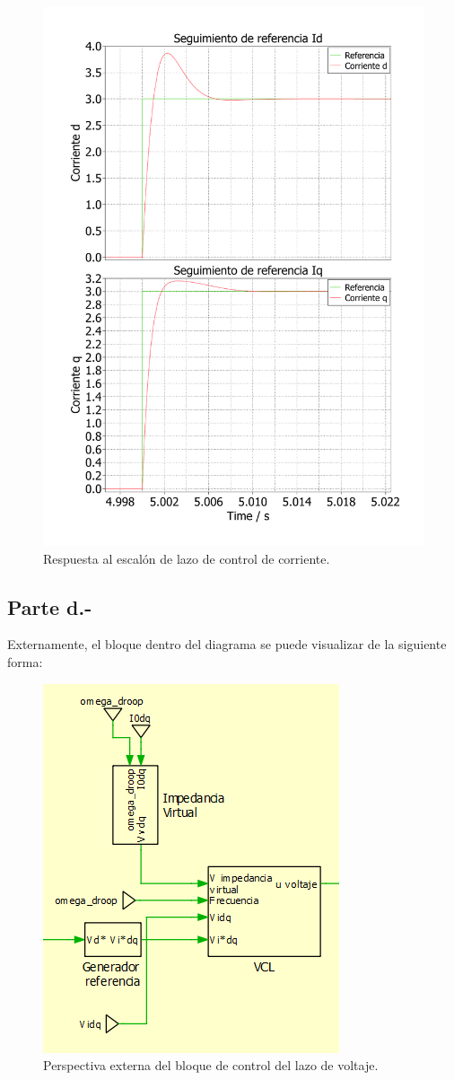 \begin{figure}
   \centering
   \includegraphics[width=0.5\linewidth]{Tarea 1/report/imagenes/p1c/respuesta_escalon_ccl.pdf}
   \caption{Respuesta al escalón de lazo de control de corriente.}
   \label{step_response_ccl}
\end{figure}

\subsection{Parte d.-}

Externamente, el bloque dentro del diagrama se puede visualizar de la siguiente forma:

\begin{figure}
   \centering
   \includegraphics[width=0.5\linewidth]{Tarea 1/report/imagenes/p1d/vcl bloque externo.png}
   \caption{Perspectiva externa del bloque de control del lazo de voltaje.}
   \label{vcl externo}
\end{figure}


